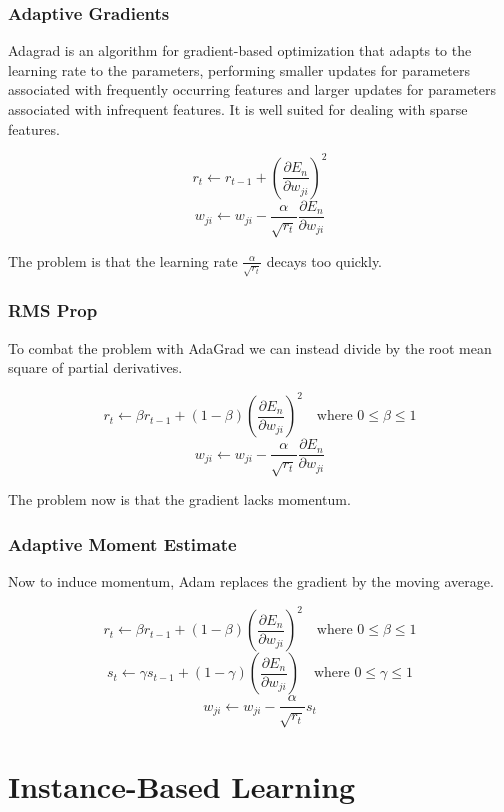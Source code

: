 \documentclass[12pt]{article}
\begin{document}
        \subsubsection{Adaptive Gradients} \label{sec:AdaGrad}
            Adagrad is an algorithm for gradient-based optimization that adapts to the learning rate to the parameters,
            performing smaller updates for parameters associated with frequently occurring features and larger updates for
            parameters associated with infrequent features. It is well suited for dealing with sparse features.

            $$ r_t \leftarrow r_{t-1} + (\frac{\partial E_n}{\partial w_{ji}})^2 $$
            $$ w_{ji} \leftarrow w_{ji} - \frac{\alpha}{\sqrt{r_t}} \frac{\partial E_n}{\partial w_{ji}} $$

            The problem is that the learning rate $\frac{\alpha}{\sqrt{r_t}}$ decays too quickly.

        \subsubsection{RMS Prop} \label{sec:RMSProp}
            To combat the problem with AdaGrad we can instead divide by the root mean square of partial derivatives.

            $$ r_t \leftarrow \beta r_{t-1} + (1 - \beta)(\frac{\partial E_n}{\partial w_{ji}})^2 \quad \text{where $0
            \leq \beta \leq 1$}$$
            $$ w_{ji} \leftarrow w_{ji} - \frac{\alpha}{\sqrt{r_t}} \frac{\partial E_n}{\partial w_{ji}} $$

            The problem now is that the gradient lacks momentum.

        \subsubsection{Adaptive Moment Estimate} \label{sec:ADAM}
            Now to induce momentum, Adam replaces the gradient by the moving average.

            $$ r_t \leftarrow \beta r_{t-1} + (1 - \beta)(\frac{\partial E_n}{\partial w_{ji}})^2 \quad \text{where $0
            \leq \beta \leq 1$} $$
            $$ s_t \leftarrow \gamma s_{t-1} + (1 - \gamma)(\frac{\partial E_n}{\partial w_{ji}}) \quad \text{where $0
            \leq \gamma \leq 1$} $$
            $$ w_{ji} \leftarrow w_{ji} - \frac{\alpha}{\sqrt{r_t}}s_t $$

\section{Instance-Based Learning}
\end{document}
